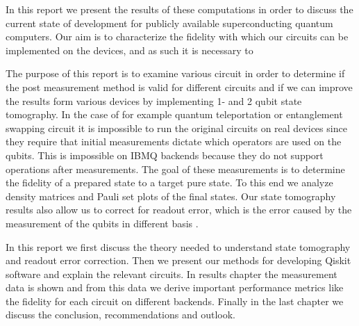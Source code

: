 In this report we present the results of these computations in order to
discuss the current state of development for publicly available superconducting
quantum computers. Our aim is to characterize the fidelity with which our
circuits can be implemented on the devices, and as such it is necessary to 

The purpose of this report is to examine various circuit in order to determine
if the post measurement method is valid for different circuits and if we can
improve the results form various devices by implementing 1- and 2 qubit state
tomography. In the case of for example quantum teleportation or entanglement
swapping circuit it is impossible to run the original circuits on real devices
since they require that initial measurements dictate which operators are used on
the qubits. This is impossible on IBMQ backends because they do not support
operations after measurements. The goal of these measurements is to determine
the fidelity of a prepared state to a target pure state. To this end we analyze
density matrices and Pauli set plots of the final states. Our state tomography
results also allow us to correct for readout error, which is the error caused by
the measurement of the qubits in different basis \cite{nielsen10_quant}.

In this report we first discuss the theory needed to understand state tomography
and readout error correction. Then we present our methods for developing Qiskit
software and explain the relevant circuits. In results chapter the measurement
data is shown and from this data we derive important performance metrics like
the fidelity for each circuit on different backends. Finally in the last chapter
we discuss the conclusion, recommendations and outlook.

